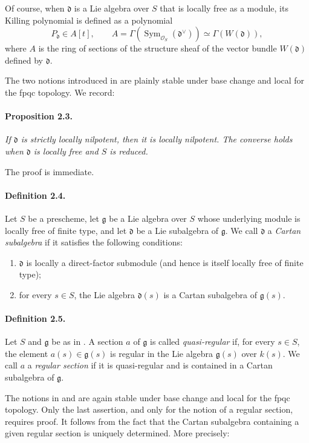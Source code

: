 Of course, when \(\mathfrak d\) is a Lie algebra over \(S\) that is
locally free as a module, its Killing polynomial is defined as a
polynomial
\[
  P_{\mathfrak d}\in A[t],
  \qquad
  A=\Gamma\!\left(\operatorname{Sym}_{\mathcal O_S}(\mathfrak d^\vee)\right)
   \simeq \Gamma\!\left(W(\mathfrak d)\right),
\]
where \(A\) is the ring of sections of the structure sheaf of the
vector bundle \(W(\mathfrak d)\) defined by \(\mathfrak d\).

The two notions introduced in  are plainly stable under base
change and local for the fpqc topology. We record:

\paragraph{\textbf{Proposition 2.3.}}
\emph{If \(\mathfrak d\) is strictly locally nilpotent, then it is
locally nilpotent. The converse holds when \(\mathfrak d\) is
locally free and \(S\) is reduced.}

The proof is immediate.

\paragraph{\textbf{Definition 2.4.}}
Let \(S\) be a prescheme, let \(\mathfrak g\) be a Lie algebra over
\(S\) whose underlying module is locally free of finite type, and
let \(\mathfrak d\) be a Lie subalgebra of \(\mathfrak g\). We call
\(\mathfrak d\) a \emph{Cartan subalgebra} if it satisfies the
following conditions:
\begin{enumerate}
\item[\textup{\SGAInlineRefTarget{sga3:xiv:2.4:item:i}(i)}] \(\mathfrak d\) is locally a direct-factor
  submodule \textup{(and hence is itself locally free of finite
  type)};
\item[\textup{(ii)}] for every \(s\in S\), the Lie algebra
  \(\mathfrak d(s)\) is a Cartan subalgebra of
  \(\mathfrak g(s)\).
\end{enumerate}

\paragraph{\textbf{Definition 2.5.}}
Let \(S\) and \(\mathfrak g\) be as in . A section \(a\) of
\(\mathfrak g\) is called \emph{quasi-regular} if, for every
\(s\in S\), the element \(a(s)\in\mathfrak g(s)\) is regular in the
Lie algebra \(\mathfrak g(s)\) over \(k(s)\). We call \(a\) a
\emph{regular section} if it is quasi-regular and is contained in a
Cartan subalgebra of \(\mathfrak g\).

The notions in  and  are again stable under base change and
local for the fpqc topology. Only the last assertion, and only for
the notion of a regular section, requires proof. It follows from the
fact that the Cartan subalgebra containing a given regular section
is uniquely determined. More precisely:
